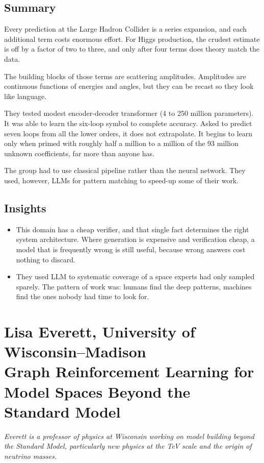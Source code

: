 \documentclass[11pt]{article}
\begin{document}
\subsection*{Summary}
Every prediction at the Large Hadron Collider is a series expansion, and each additional term costs enormous effort. For Higgs production, the crudest estimate is off by a factor of two to three, and only after four terms does theory match the data.

The building blocks of those terms are scattering amplitudes. Amplitudes are continuous functions of energies and angles, but they can be recast so they look like language. 

They tested modest encoder-decoder transformer (4 to 250 million parameters). It was able to learn the six-loop symbol to complete accuracy. Asked to predict seven loops from all the lower orders, it does not extrapolate. It begins to learn only when primed with roughly half a million to a million of the 93 million unknown coefficients, far more than anyone has.

The group had to use classical pipeline rather than the neural network. They used, however, LLMs for pattern matching to speed-up some of their work.

\subsection*{Insights}
\begin{itemize}
    \item This domain has a cheap verifier, and that single fact determines the right system architecture. Where generation is expensive and verification cheap, a model that is frequently wrong is still useful, because wrong answers cost nothing to discard.
    \item They used LLM to systematic coverage of a space experts had only sampled sparely. The pattern of work was: humans find the deep patterns, machines find the ones nobody had time to look for.
\end{itemize}

\section{Lisa Everett, University of Wisconsin--Madison\\ {\large Graph Reinforcement Learning for Model Spaces Beyond the Standard Model}}

\emph{Everett is a professor of physics at Wisconsin working on model building beyond the Standard Model, particularly new physics at the TeV scale and the origin of neutrino masses.}
\end{document}
